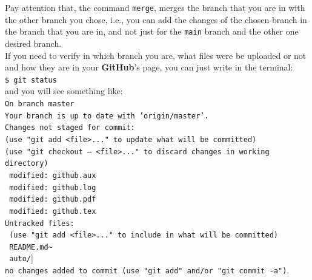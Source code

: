 \documentclass[12pt,a4paper,titlepage,brazil]{article}
\begin{document}
{Pay attention that, the command \texttt{merge}, merges the branch that you are in with the other branch you chose, i.e., you can add the changes of the chosen branch in the branch that you are in, and not just for the \texttt{main} branch and the other one desired branch.\\

If you need to verify in which branch you are, what files were be uploaded or not and how they are in your {\bf GitHub}'s page, you can just write in the terminal:\\

\texttt{\$ git status}\\

and you will see something like:\\

\texttt{On branch master}\\

\texttt{Your branch is up to date with 'origin/master'.}\\

\texttt{Changes not staged for commit:}\\

\texttt{(use "git add <file>..." to update what will be committed)}\\

\texttt{(use "git checkout -- <file>..." to discard changes in working directory)}\\

\texttt{	modified:   github.aux}\\

\texttt{	modified:   github.log}\\

\texttt{        modified:   github.pdf}\\

\texttt{        modified:   github.tex}\\

\texttt{Untracked files:}\\

\texttt{  (use "git add <file>..." to include in what will be committed)}\\

\texttt{	README.md\~}\\

\texttt{	auto/}]\\

\texttt{no changes added to commit (use "git add" and/or "git commit -a")}.\\

}
\end{document}
